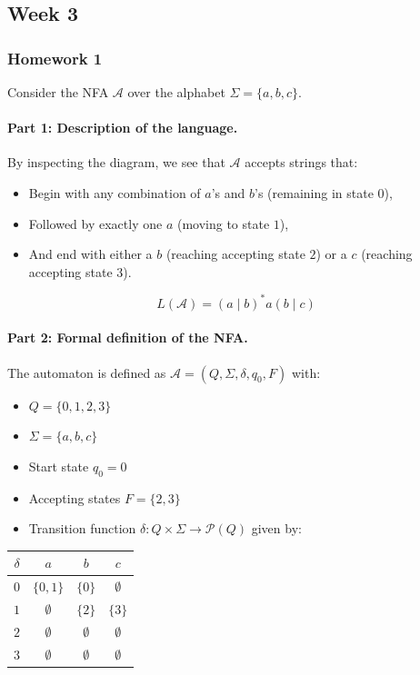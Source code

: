 \documentclass{article}
\theoremstyle{theorem}
\theoremstyle{definition}
\theoremstyle{remark}
\begin{document}
\subsection{Week 3}

\subsubsection*{Homework 1}

Consider the NFA $\mathcal{A}$ over the alphabet $\Sigma = \{a, b, c\}$.

\paragraph{Part 1: Description of the language.}

By inspecting the diagram, we see that $\mathcal{A}$ accepts strings that:
\begin{itemize}
\item Begin with any combination of $a$'s and $b$'s (remaining in state $0$),
\item Followed by exactly one $a$ (moving to state $1$),
\item And end with either a $b$ (reaching accepting state $2$) or a $c$ (reaching accepting state $3$).
\end{itemize}

\[
\boxed{L(\mathcal{A}) = (a \mid b)^* a (b \mid c)}
\]

\paragraph{Part 2: Formal definition of the NFA.}

The automaton is defined as $\mathcal{A} = (Q, \Sigma, \delta, q_0, F)$ with:
\begin{itemize}
\item $Q = \{0,1,2,3\}$
\item $\Sigma = \{a,b,c\}$
\item Start state $q_0 = 0$
\item Accepting states $F = \{2,3\}$
\item Transition function $\delta: Q \times \Sigma \to \mathcal{P}(Q)$ given by:
\end{itemize}

\begin{center}
\begin{tabular}{c|ccc}
$\delta$ & $a$ & $b$ & $c$ \\ \hline
$0$ & $\{0,1\}$ & $\{0\}$ & $\emptyset$ \\
$1$ & $\emptyset$ & $\{2\}$ & $\{3\}$ \\
$2$ & $\emptyset$ & $\emptyset$ & $\emptyset$ \\
$3$ & $\emptyset$ & $\emptyset$ & $\emptyset$
\end{tabular}
\end{center}
\end{document}
